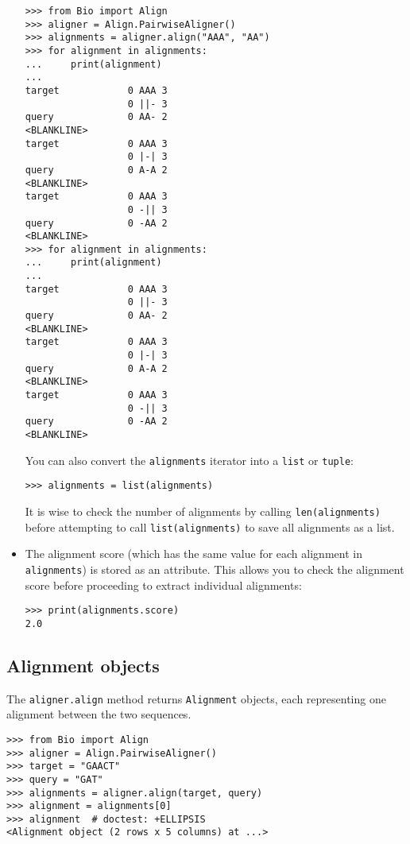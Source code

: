 \begin{itemize}
\begin{verbatim}
>>> from Bio import Align
>>> aligner = Align.PairwiseAligner()
>>> alignments = aligner.align("AAA", "AA")
>>> for alignment in alignments:
...     print(alignment)
...
target            0 AAA 3
                  0 ||- 3
query             0 AA- 2
<BLANKLINE>
target            0 AAA 3
                  0 |-| 3
query             0 A-A 2
<BLANKLINE>
target            0 AAA 3
                  0 -|| 3
query             0 -AA 2
<BLANKLINE>
>>> for alignment in alignments:
...     print(alignment)
...
target            0 AAA 3
                  0 ||- 3
query             0 AA- 2
<BLANKLINE>
target            0 AAA 3
                  0 |-| 3
query             0 A-A 2
<BLANKLINE>
target            0 AAA 3
                  0 -|| 3
query             0 -AA 2
<BLANKLINE>
\end{verbatim}
You can also convert the \verb+alignments+ iterator into a \verb+list+ or \verb+tuple+:
\begin{verbatim}
>>> alignments = list(alignments)
\end{verbatim}
It is wise to check the number of alignments by calling \verb+len(alignments)+ before attempting to call \verb+list(alignments)+ to save all alignments as a list.
\item The alignment score (which has the same value for each alignment in \verb+alignments+) is stored as an attribute. This allows you to check the alignment score before proceeding to extract individual alignments:

\begin{verbatim}
>>> print(alignments.score)
2.0
\end{verbatim}
\end{itemize}

\subsection{Alignment objects}
The \verb+aligner.align+ method returns \verb+Alignment+ objects, each representing one alignment between the two sequences.

\begin{verbatim}
>>> from Bio import Align
>>> aligner = Align.PairwiseAligner()
>>> target = "GAACT"
>>> query = "GAT"
>>> alignments = aligner.align(target, query)
>>> alignment = alignments[0]
>>> alignment  # doctest: +ELLIPSIS
<Alignment object (2 rows x 5 columns) at ...>
\end{verbatim}

